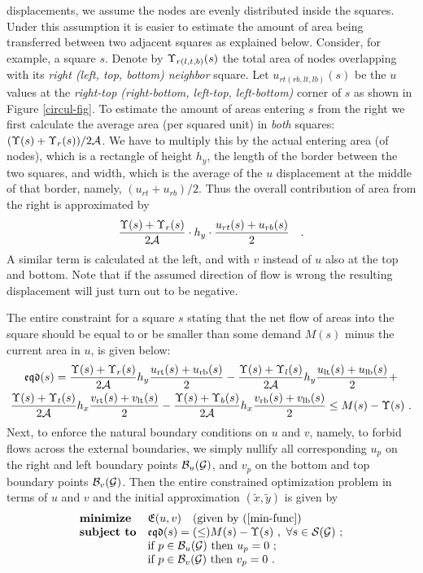 \documentclass[final]{siamltex}
\begin{document}
displacements, we assume the nodes are evenly distributed inside
the squares. Under this assumption it is easier to estimate the
amount of area being transferred between two adjacent squares as
explained below. Consider, for example, a square $s$. Denote by
$\Upsilon_{r(l,t,b)}(s)$ the total area of nodes overlapping with its
{\it right (left, top, bottom) neighbor} square. Let
$u_{rt(rb,lt,lb)}(s)$ be the $u$ values at the {\it right-top
(right-bottom, left-top, left-bottom)} corner of $s$ as shown in
Figure \ref{circul-fig}. To estimate the amount of areas entering
$s$ from the right we first calculate the average area (per
squared unit) in {\it both} squares: $(\Upsilon(s)+\Upsilon_r(s))/2\mathcal{A}$.
We have to multiply this by the actual entering area (of nodes),
which is a rectangle of height $h_y$, the length of the border
between the two squares, and width, which is the average of the $u$
displacement at the middle of that border, namely,
$(u_{rt}+u_{rb})/2$. Thus the overall contribution of area from
the right is approximated by
\[
\frac{\Upsilon(s)+\Upsilon_r(s)}{2\mathcal{A}} \cdot h_y \cdot
\frac{u_{rt}(s)+u_{rb}(s)}{2}~~~.
\]
A similar term is calculated at the left, and with $v$ instead of
$u$ also at the top and bottom. Note that if the assumed direction
of flow is wrong the resulting displacement will just turn out to
be negative.
\par The entire constraint for a square $s$ stating that the net flow of areas into the square
 should be equal to or be smaller than some demand $M(s)$ minus the current area in $u$, is given below:
\begin{multline}\label{ed-constraint}
\mathfrak{eqd}(s) = \frac{\Upsilon(s) + \Upsilon_r(s)}{2\mathcal{A}}h_y
\frac{u_{\text{rt}}(s)+u_{\text{rb}}(s)}{2}- \frac{\Upsilon(s) +
\Upsilon_l(s)}{2\mathcal{A}}h_y
\frac{u_{\text{lt}}(s)+u_{\text{lb}}(s)}{2} + \\
\frac{\Upsilon(s) + \Upsilon_t(s)}{2\mathcal{A}}h_x \frac{v_{\text{rt}}(s)+
v_{\text{lt}}(s)}{2}- \frac{\Upsilon(s) + \Upsilon_b(s)}{2\mathcal{A}}h_x
\frac{v_{\text{rb}}(s)+v_{\text{lb}}(s)}{2} \leq M(s) - \Upsilon(s) ~.
\end{multline}
Next, to enforce the natural boundary conditions on $u$ and $v$,
namely, to forbid flows across the external boundaries, we simply
nullify all corresponding $u_p$ on the right and left boundary
points $\mathcal{B}_u(\mathcal{G})$, and $v_p$ on the bottom and top boundary points
$\mathcal{B}_v(\mathcal{G})$.
Then the entire constrained optimization problem in terms of $u$
and $v$ and the initial approximation $(\tilde{x},\tilde{y})$ is
given by
\begin{equation}\label{full2var-problem}
\begin{array}{ll}
\mbox{\textbf{minimize}}  & \mathfrak{E}(u, v) ~~~(\text{given by } (\ref{min-func})\\
\mbox{\textbf{subject to}} &  \mathfrak{eqd}(s)=(\leq) M(s) - \Upsilon(s) ~,~  \forall s \in \mathcal{S}(\mathcal{G}) ~ ;\\
                    & \mbox{if } p\in \mathcal{B}_u(\mathcal{G}) \text{ then } u_p=0 ~;\\
                    & \mbox{if } p\in \mathcal{B}_v(\mathcal{G}) \text{ then } v_p=0 ~.
\end{array}
\end{equation}
\end{document}
